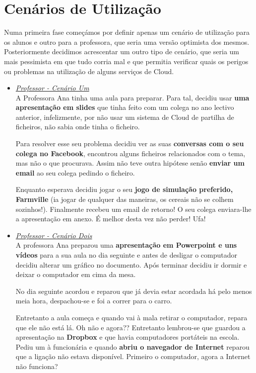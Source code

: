 \chapter{Cenários de Utilização}
\label{chap:usage} 

Numa primeira fase começámos por definir apenas um cenário de utilização para os alunos e outro para a professora, que seria uma versão optimista dos mesmos. Posteriormente decidimos acrescentar um outro tipo de cenário, que seria um mais pessimista em que tudo corria mal e que permitia verificar quais os perigos ou problemas na utilização de alguns serviços de Cloud.

\begin{itemize}

\item \textit{\underline{Professor - Cenário Um}}\\

A Professora Ana tinha uma aula para preparar. Para tal, decidiu usar \textbf{uma apresentação em slides} que tinha feito com um colega no ano lectivo anterior, infelizmente, por não usar um sistema de Cloud de partilha de ficheiros, não sabia onde tinha o ficheiro.

Para resolver esse seu problema decidiu ver as suas \textbf{conversas com o seu colega no Facebook}, encontrou alguns ficheiros relacionados com o tema, mas não o que procurava. Assim não teve outra hipótese senão \textbf{enviar um email} ao seu colega pedindo o ficheiro.

Enquanto esperava decidiu jogar o seu \textbf{jogo de simulação preferido, Farmville} (ia jogar de qualquer das maneiras, os cereais não se colhem sozinhos!). Finalmente recebeu um email de retorno! O seu colega enviara-lhe a apresentação em anexo. É melhor desta vez não perder! Ufa!

\item \textit{\underline{Professor - Cenário Dois}}\\

A professora Ana preparou uma \textbf{apresentação em Powerpoint e uns vídeos} para a sua aula no dia seguinte e antes de desligar o computador decidiu alterar um gráfico no documento. Após terminar decidiu ir dormir e deixar o computador em cima da mesa.

No dia seguinte acordou e reparou que já devia estar acordada há pelo menos meia hora, despachou-se e foi a correr para o carro.

Entretanto a aula começa e quando vai à mala retirar o computador, repara que ele não está lá. Oh não e agora?? Entretanto lembrou-se que guardou a apresentação na \textbf{Dropbox} e que havia computadores portáteis na escola. Pediu um à funcionária e quando \textbf{abriu o navegador de Internet} reparou que a ligação não estava disponível. Primeiro o computador, agora a Internet não funciona? 


\end{itemize}
